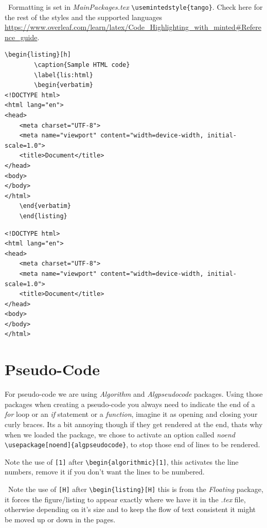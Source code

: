 \faWarning\, Formatting is set in \emph{MainPackages.tex} \verb=\usemintedstyle{tango}=. Check here for the rest of the styles and the supported languages \url{https://www.overleaf.com/learn/latex/Code_Highlighting_with_minted#Reference_guide}.

\begin{Verbatim}[fontsize=\relsize{-1.5}]
    \begin{listing}[h]
        \caption{Sample HTML code}
        \label{lis:html}
        \begin{verbatim}
<!DOCTYPE html>
<html lang="en">
<head>
    <meta charset="UTF-8">
    <meta name="viewport" content="width=device-width, initial-scale=1.0">
    <title>Document</title>
</head>
<body>
</body>
</html>
    \end{verbatim}
    \end{listing}
\end{Verbatim}
\begin{listing}[h]
    \caption{Sample HTML code}
    \label{lis:html}
    \begin{verbatim}
<!DOCTYPE html>
<html lang="en">
<head>
    <meta charset="UTF-8">
    <meta name="viewport" content="width=device-width, initial-scale=1.0">
    <title>Document</title>
</head>
<body>
</body>
</html>
    \end{verbatim}
\end{listing}
\section{Pseudo-Code}
For pseudo-code we are using \emph{Algorithm} and \emph{Algpseudocode} packages.
Using those packages when creating a pseudo-code you always need to indicate the end of a \emph{for} loop or an \emph{if} statement or a \emph{function}, imagine it as opening and closing your curly braces. Its a bit annoying though if they get rendered at the end, thats why when we loaded the package, we chose to activate an option called \emph{noend} \verb=\usepackage[noend]{algpseudocode}=, to stop those end of lines to be rendered.

Note the use of \verb=[1]= after \verb=\begin{algorithmic}[1]=, this activates the line numbers, remove it if you don't want the lines to be numbered.

\faWarning\, Note the use of \verb=[H]= after \verb=\begin{listing}[H]= this is from the \emph{Floating} package, it forces the figure/listing to appear exactly where we have it in the \emph{.tex} file, otherwise depending on it's size and to keep the flow of text consistent it might be moved up or down in the pages.

